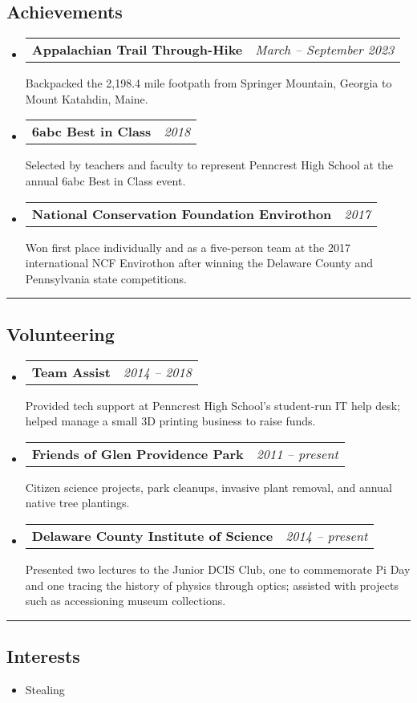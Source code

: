 \documentclass[11pt,letterpaper]{article}
\makeatletter
\newcommand{\headerrow}[2]
{\begin{tabular*}{\linewidth}{l@{\extracolsep{\fill}}r}
	#1 &
	#2 \\
\end{tabular*}}
\makeatother
\begin{document}
\subsection*{Achievements}

\begin{itemize}
	\parskip=0.1em

	\item
	\headerrow
		{\bfseries Appalachian Trail Through-Hike}
		{\em March -- September 2023}
	Backpacked the 2,198.4 mile footpath from Springer Mountain, Georgia to Mount Katahdin, Maine.

	\item
	\headerrow
		{\bfseries 6abc Best in Class}
		{\em 2018}
	Selected by teachers and faculty to represent Penncrest High School at the annual 6abc Best in Class event.

	\item
	\headerrow
		{\bfseries National Conservation Foundation Envirothon}
		{\em 2017}
	Won first place individually and as a five-person team at the 2017 international NCF Envirothon after winning the Delaware County and Pennsylvania state competitions.

\end{itemize}

\hrule
\vspace{-0.4em}
\subsection*{Volunteering}

\begin{itemize}
	\parskip=0.1em

	\item
	\headerrow
		{\bfseries Team Assist}
		{\em 2014 -- 2018}
	Provided tech support at Penncrest High School's student-run IT help desk;
	helped manage a small 3D printing business to raise funds.

	\item
	\headerrow
		{\bfseries Friends of Glen Providence Park}
		{\em 2011 -- present}
	Citizen science projects, park cleanups, invasive plant removal, and annual native tree plantings.

	\item
	\headerrow
		{\bfseries Delaware County Institute of Science}
		{\em 2014 -- present}
	Presented two lectures to the Junior DCIS Club, one to commemorate Pi Day and one tracing the history of physics through optics; assisted with projects such as accessioning museum collections.

\end{itemize}

\hrule
\vspace{-0.4em}
\subsection*{Interests}

\begin{itemize}

	\item[]
	Stealing

\end{itemize}
\end{document}

